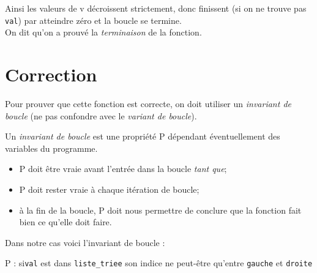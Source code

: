 Ainsi les valeurs de v décroissent strictement, donc finissent (si on ne trouve pas \texttt{val}) par atteindre zéro et la boucle se termine.\\
On dit qu'on a prouvé la \textit{terminaison} de la fonction.

\section{Correction}

Pour prouver que cette fonction est correcte, on doit utiliser un \textit{invariant de boucle} (ne pas confondre avec le \textit{variant de boucle}).

\begin{definition}
	Un \textit{invariant de boucle} est une propriété P dépendant éventuellement des variables du programme.
	\begin{itemize}
		\item 	P doit être vraie avant l'entrée dans la boucle \textit{tant que};
		\item 	P doit rester vraie à chaque itération de boucle;
		\item 	à la fin de la boucle, P doit nous permettre de conclure que la fonction \og fait bien ce qu'elle doit faire\fg{}.
	\end{itemize}
\end{definition}

Dans notre cas voici l'invariant de boucle :
\begin{center}
	P :  si\texttt{val} est dans \texttt{liste_triee} son indice ne peut-être qu'entre \texttt{gauche} et \texttt{droite}\fg{}
\end{center}

